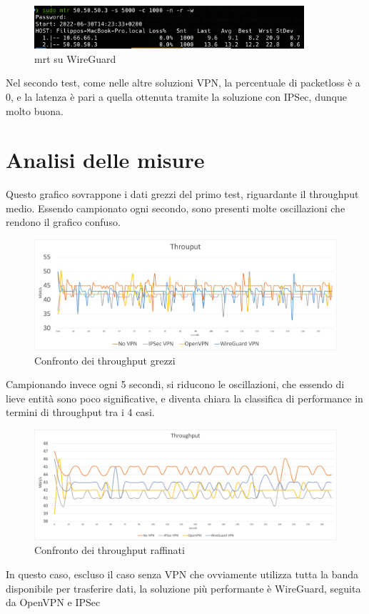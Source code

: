 \begin{figure}[ht]
    \centering
    \includegraphics[width=10cm]{figure/mrt_16min_wg.png}
    \caption{mrt su WireGuard}
\end{figure}

Nel secondo test, come nelle altre soluzioni VPN, la percentuale di packetloss è a 0, e la latenza è pari a quella ottenuta tramite la soluzione con IPSec, dunque molto buona.

\section{Analisi delle misure}
Questo grafico sovrappone i dati grezzi del primo test, riguardante il throughput medio. Essendo campionato ogni secondo, sono presenti molte oscillazioni che rendono il grafico confuso.
\begin{figure}[ht]
    \centering
    \includegraphics[width=14cm]{figure/rawThroughput.png}
    \caption{Confronto dei throughput grezzi}
\end{figure}

Campionando invece ogni 5 secondi, si riducono le oscillazioni, che essendo di lieve entità sono poco significative, e diventa chiara la classifica di performance in termini di throughput tra i 4 casi.


\begin{figure}[ht]
    \centering
    \includegraphics[width=14cm]{figure/fineThroughput.png}
    \caption{Confronto dei throughput raffinati}
\end{figure}
In questo caso, escluso il caso senza VPN che ovviamente utilizza tutta la banda disponibile per trasferire dati, la soluzione più performante è WireGuard, seguita da OpenVPN e IPSec

